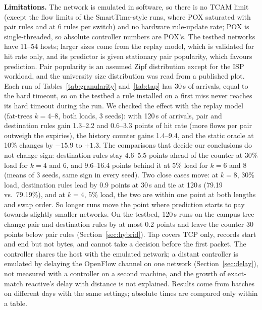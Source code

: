 \documentclass[sigconf]{acmart}
\begin{document}
\textbf{Limitations.} The network is emulated in software, so there is no TCAM limit (except the flow limits of the SmartTime-style runs, where POX saturated with pair rules and at 6 rules per switch) and no hardware rule-update rate; POX is single-threaded, so absolute controller numbers are POX's. The testbed networks have 11--54 hosts; larger sizes come from the replay model, which is validated for hit rate only, and its predictor is given stationary pair popularity, which favours prediction. Pair popularity is an assumed Zipf distribution except for the ISP workload, and the university size distribution was read from a published plot. Each run of Tables~\ref{tab:granularity} and~\ref{tab:tap} has 30\,s of arrivals, equal to the hard timeout, so on the testbed a rule installed on a first miss never reaches its hard timeout during the run. We checked the effect with the replay model (fat-trees $k{=}4$--8, both loads, 3 seeds): with 120\,s of arrivals, pair and destination rules gain 1.3--2.2 and 0.6--3.3 points of hit rate (more flows per pair outweigh the expiries), the history counter gains 1.4--9.4, and the static oracle at 10\% changes by $-15.9$ to $+1.3$. The comparisons that decide our conclusions do not change sign: destination rules stay 4.6--5.5 points ahead of the counter at 30\% load for $k{=}4$ and 6, and 9.6--16.4 points behind it at 5\% load for $k{=}6$ and 8 (means of 3 seeds, same sign in every seed). Two close cases move: at $k{=}8$, 30\% load, destination rules lead by 0.9 points at 30\,s and tie at 120\,s (79.19 vs.\ 79.19\%), and at $k{=}4$, 5\% load, the two are within one point at both lengths and swap order. So longer runs move the point where prediction starts to pay towards slightly smaller networks. On the testbed, 120\,s runs on the campus tree change pair and destination rules by at most 0.2 points and leave the counter 30 points below pair rules (Section~\ref{sec:hybrid}). Tap covers TCP only, records start and end but not bytes, and cannot take a decision before the first packet. The controller shares the host with the emulated network; a distant controller is emulated by delaying the OpenFlow channel on one network (Section~\ref{sec:delay}), not measured with a controller on a second machine, and the growth of exact-match reactive's delay with distance is not explained. Results come from batches on different days with the same settings; absolute times are compared only within a table.
\end{document}
